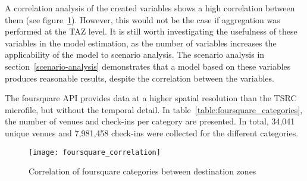 A correlation analysis of the created variables shows a high correlation between them (see figure~\ref{fig:foursquare-correlation}). However, this would not be the case if aggregation was performed at the TAZ level. It is still worth investigating the usefulness of these variables in the model estimation, as the number of variables increases the applicability of the model to scenario analysis.  The scenario analysis in section~\ref{scenario-analysis} demonstrates that a model based on these variables produces reasonable results, despite the correlation between the variables.

The foursquare API provides data at a higher spatial resolution than the TSRC microfile, but without the temporal detail. In table~\ref{table:foursquare_categories}, the number of venues and check-ins per category are presented. In total, 34,041 unique venues and 7,981,458 check-ins were collected for the different categories.
\begin{figure}[H]
\centering
\texttt{[image: foursquare\_correlation]}
\caption{Correlation of foursquare categories between destination zones}
\label{fig:foursquare-correlation}
\end{figure}




